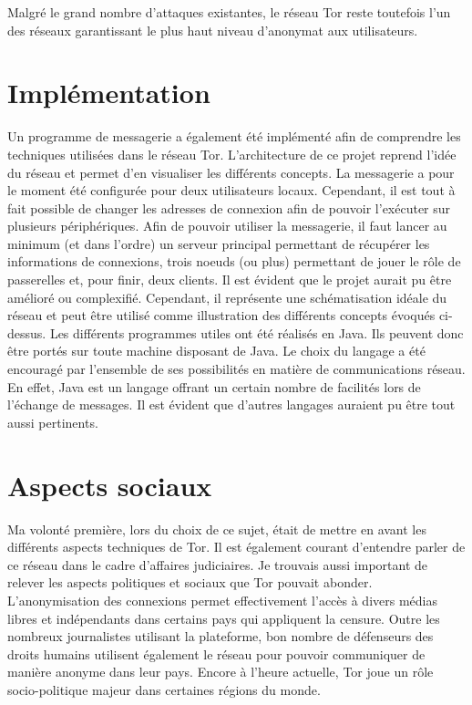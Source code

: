 \documentclass[letterpaper]{article}
\begin{document}
\noindent Malgré le grand nombre d'attaques existantes, le réseau Tor reste toutefois l'un des réseaux garantissant le plus haut niveau d'anonymat aux utilisateurs.


\section{Implémentation}
Un programme de messagerie a également été implémenté afin de comprendre les techniques utilisées dans le réseau Tor. L'architecture de ce projet reprend l'idée du réseau et permet d'en visualiser les différents concepts. La messagerie a pour le moment été configurée pour deux utilisateurs locaux. Cependant, il est tout à fait possible de changer les adresses de connexion afin de pouvoir l'exécuter sur plusieurs périphériques. Afin de pouvoir utiliser la messagerie, il faut lancer au minimum (et dans l'ordre) un serveur principal permettant de récupérer les informations de connexions, trois noeuds (ou plus) permettant de jouer le rôle de passerelles et, pour finir, deux clients. Il est évident que le projet aurait pu être amélioré ou complexifié. Cependant, il représente une schématisation idéale du réseau et peut être utilisé comme illustration des différents concepts évoqués ci-dessus. Les différents programmes utiles ont été réalisés en Java. Ils peuvent donc être portés sur toute machine disposant de Java. Le choix du langage a été encouragé par l'ensemble de ses possibilités en matière de communications réseau. En effet, Java est un langage offrant un certain nombre de facilités lors de l'échange de messages. Il est évident que d'autres langages auraient pu être tout aussi pertinents. 


\section{Aspects sociaux}
Ma volonté première, lors du choix de ce sujet, était de mettre en avant les différents aspects techniques de Tor. Il est également courant d'entendre parler de ce réseau dans le cadre d'affaires judiciaires. Je trouvais aussi important de relever les aspects politiques et sociaux que Tor pouvait abonder. L'anonymisation des connexions permet effectivement l'accès à divers médias libres et indépendants dans certains pays qui appliquent la censure. Outre les nombreux journalistes utilisant la plateforme, bon nombre de défenseurs des droits humains utilisent également le réseau pour pouvoir communiquer de manière anonyme dans leur pays. Encore à l'heure actuelle, Tor joue un rôle socio-politique majeur dans certaines régions du monde.
\end{document}
